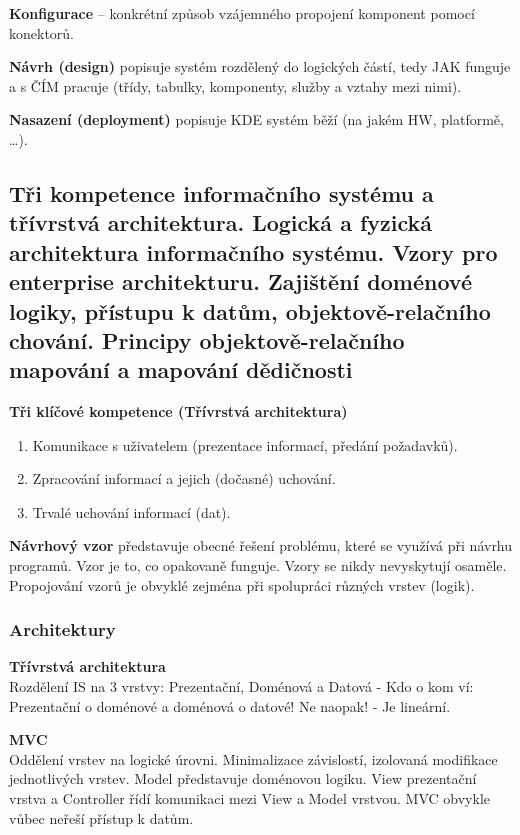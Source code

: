 \textbf{Konfigurace} -- konkrétní způsob vzájemného propojení komponent pomocí konektorů.

\textbf{Návrh (design)} popisuje systém rozdělený do logických částí, tedy JAK funguje a s ČÍM pracuje (třídy, tabulky, komponenty, služby a vztahy mezi nimi).

\textbf{Nasazení (deployment)} popisuje KDE systém běží (na jakém HW, platformě, \ldots).

\subsection[Kompetence IS, Architektury, Vzory]{Tři kompetence informačního systému a třívrstvá architektura. Logická a fyzická architektura informačního systému. Vzory pro enterprise architekturu. Zajištění doménové logiky, přístupu k datům, objektově-relačního chování. Principy objektově-relačního mapování a mapování dědičnosti}
\textbf{Tři klíčové kompetence (Třívrstvá architektura)}
\begin{enumerate}
\item Komunikace s uživatelem (prezentace informací, předání požadavků).
\item Zpracování informací a jejich (dočasné) uchování.
\item Trvalé uchování informací (dat).
\end{enumerate}

\textbf{Návrhový vzor} představuje obecné řešení problému, které se využívá při návrhu programů. Vzor je to, co opakovaně funguje. Vzory se nikdy nevyskytují osaměle. Propojování vzorů je obvyklé zejména při spolupráci různých vrstev (logik).

\subsubsection{Architektury}
\textbf{Třívrstvá architektura}\\
Rozdělení IS na 3 vrstvy: Prezentační, Doménová a Datová - Kdo o kom ví: Prezentační o doménové a doménová o datové! Ne naopak! - Je lineární.

\textbf{MVC}\\
Oddělení vrstev na logické úrovni. Minimalizace závislostí, izolovaná modifikace jednotlivých vrstev. Model představuje  doménovou logiku. View prezentační vrstva a Controller řídí komunikaci mezi View a Model vrstvou. MVC obvykle vůbec neřeší přístup k datům.

